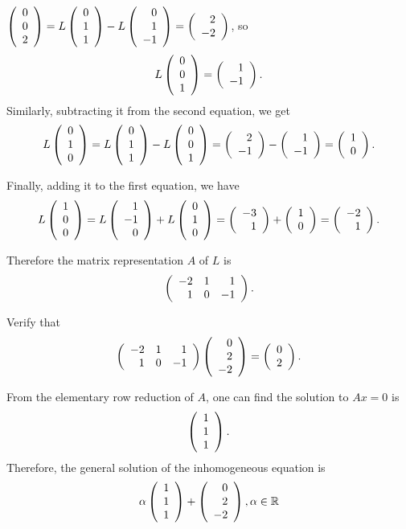 \documentclass{ximera}
\begin{document}
\begin{exercise}
\begin{solution}
\begin{enumeratea}
\item  $\Matrix{ 0\\0\\2 }=L\Matrix{ 0\\1\\1}-L\Matrix{0\\1\\-1}=\Matrix{2\\-2 }$, so 
\[
L\Matrix{0\\0\\1}=\Matrix{1\\-1}.
\]
Similarly, subtracting it from the second equation, we get 
\[
L\Matrix{0\\1\\0}=L\Matrix{ 0\\1\\1}-L\Matrix{0\\0\\1}=\Matrix{2\\-1}-\Matrix{1\\-1}=\Matrix{1\\0 }.
\]

Finally, adding it to the first equation, we have 
\[
L\Matrix{1\\0\\0}=L\Matrix{1\\-1\\0}+L\Matrix{0\\1\\0}=\Matrix{ -3\\1}+\Matrix{1\\0}=\Matrix{-2\\1}.
\]

Therefore the matrix representation $A$ of $L$ is 
\[
\Matrix{ -2&1&1\\1&0&-1}.
\]

\item Verify that 
\[
\Matrix{ -2&1&1\\1&0&-1} \Matrix{0\\2\\-2} =\Matrix{0\\2}.
\]


\item From the elementary row reduction of $A$, one can find the solution to $Ax=0$ is 
\[
\Matrix{1\\1\\1}.
\]
Therefore, the general solution of the inhomogeneous equation is 
\[
\alpha \Matrix{1\\1\\1}+\Matrix{0\\2\\-2}, \alpha\in \mathbb R
\]
\end{enumeratea}



\end{solution}
\end{exercise}
\end{document}
